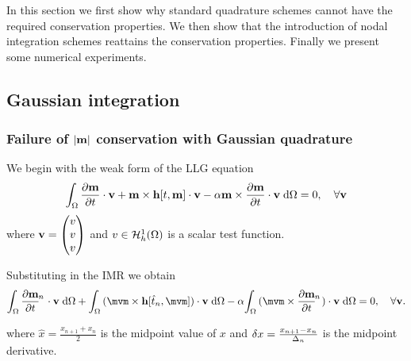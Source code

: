 In this section we first show why standard quadrature schemes cannot have the required conservation properties.
We then show that the introduction of nodal integration schemes reattains the conservation properties.
Finally we present some numerical experiments.


\subsection{Gaussian integration}

\subsubsection{Failure of $\left|{\mathbf{m}} \right|$ conservation with Gaussian quadrature}

\newcommand{\ipg}[2]{\intd{{#1} \cdot {#2}}}

We begin with the weak form of the LLG equation
\begin{equation}
  \label{eq:weak-llg}
  {\int_{\Omega} \frac{\partial \mathbf{m}}{\partial t}\cdot \mathbf{v}+ \mathbf{m}\times \mathbf{h}[t, \mathbf{m}] \cdot \mathbf{v}- \alpha\mathbf{m}\times \frac{\partial \mathbf{m}}{\partial t}\cdot \mathbf{v}{\; \text{d}}{\Omega}} = 0, \quad \forall \mathbf{v}
\end{equation}
where $\mathbf{v} = \begin{pmatrix} v \\ v \\ v \end{pmatrix}$ and $v \in {\mathcal{H}^1_h(\Omega)}$ is a scalar test function.

\newcommand{\midpoint}[1]{\hat{#1}}
\newsubcommand{\mvm}{\midpoint{\mv}}{n}
\newcommand{\tm}{\midpoint{t}_n}

\newcommand{\pdsub}[3]{\mathrlap{\pd{#1\mathrlap{_{#2}}}{#3}}\phantom{\pd{#1_{#2}}{#3}}}
\newcommand{\dtop}{\delta}
\newcommand{\dmdtm}{\pdsub{\mv}{n}{t}}
\newcommand{\dmdtml}{\pdsub{\mv}{n,l}{t}}
\newcommand{\dmdtmj}{\pdsub{\mv}{n,j}{t}}


Substituting in the IMR we obtain
\begin{equation}
  \label{eq:weak-llg-imr}
  \ipg{\dmdtm}{\testv} + \ipg{(\mvm \times \hv[\tm, \mvm])}{\testv} - \dampc \ipg{(\mvm \times \dmdtm)}{\testv} = 0, \quad \forall \testv .
\end{equation}

where $\midpoint{x} = \frac{x_{n+1} + x_{n}}{2}$ is the midpoint value of $x$ and $\dtop x = \frac{x_{n+1} - x_n}{\dtn}$ is the midpoint derivative.

